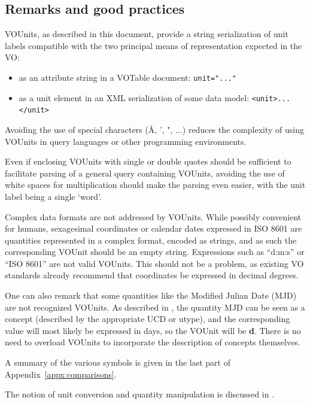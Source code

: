 \documentclass[11pt,notitlepage,onecolumn]{ivoa}
\newcommand{\unit}[1]{\textbf{\textsf{\color{orange}#1}}}
\begin{document}
\subsection{Remarks and good practices}

VOUnits, as described in this document, provide a string serialization of
unit labels compatible with the two principal
means of representation expected in the VO:
\begin{itemize}
\item as an attribute string in a VOTable document: \verb|unit="..."|
\item as a unit element in an XML serialization of some data model: \verb|<unit>...</unit>|
\end{itemize}

Avoiding the use of special characters (\AA, ', ", ...) reduces the
complexity of using VOUnits in query languages or other programming environments.

Even if enclosing VOUnits with single or double quotes should be sufficient to
facilitate parsing of a general query containing VOUnits, avoiding the use of
white spaces for multiplication should
make the parsing even easier, with the unit label being a single
`word'.


Complex data formats are not addressed by VOUnits. While possibly convenient for
humans, sexagesimal coordinates or calendar dates expressed in ISO 8601 are
quantities represented in a complex format, encoded as strings, and as such the
corresponding VOUnit should be an empty string. Expressions such as ``d:m:s'' or
``ISO 8601'' are not valid VOUnits. This should not be a problem, as existing VO 
standards already recommend that coordinates be expressed in decimal degrees.

One can also remark that some quantities like the Modified Julian Date (MJD) are 
not recognized VOUnits. As described in , the quantity MJD can be 
seen as a concept (described by the appropriate UCD or utype), and the corresponding
value will most likely be expressed in days, so the VOUnit will be \unit{d}. There is 
no need to overload VOUnits to incorporate the description of concepts themselves.

A summary of the various symbols is given in the last part of Appendix~\ref{appx:comparisons}.

The notion of unit conversion and quantity manipulation is discussed in
.
\end{document}
